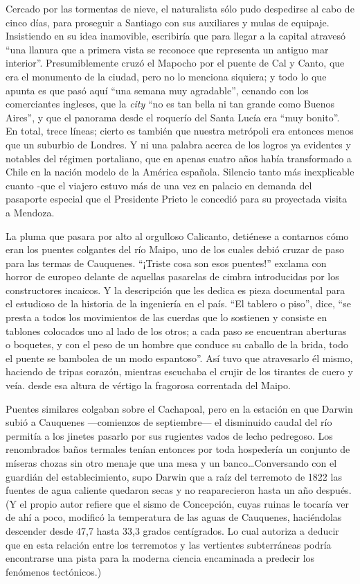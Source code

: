 \documentclass[10pt,twoside,openright]{memoir}
\begin{document}
Cercado
por las tormentas de nieve, el naturalista sólo pudo despedirse al cabo
de cinco días, para proseguir a Santiago con sus auxiliares y mulas de
equipaje. Insistiendo en su idea inamovible, escribiría que para llegar
a la capital atravesó ``una llanura que a primera vista se reconoce que
representa un antiguo mar interior''. Presumiblemente cruzó el Mapocho
por el puente de Cal y Canto, que era el monumento de la ciudad, pero no
lo menciona siquiera; y todo lo que apunta es que pasó aquí ``una semana
muy agradable'', cenando con los comerciantes ingleses, que la
\emph{city} ``no es tan bella ni tan grande como Buenos Aires'', y que el
panorama desde el roquerío del Santa Lucía era ``muy bonito''. En total,
trece líneas; cierto es también que nuestra metrópoli era entonces menos
que un suburbio de Londres. Y ni una palabra acerca de los logros ya
evidentes y notables del régimen portaliano, que en apenas cuatro
años había transformado a Chile en
la nación modelo de la América española. Silencio tanto más inexplicable
cuanto -que el viajero estuvo más de una vez en palacio en demanda del
pasaporte especial que el Presidente Prieto le concedió para su
proyectada visita a Mendoza.

La pluma que pasara por alto al orgulloso Calicanto, detiénese a
contarnos cómo eran los puentes colgantes del río Maipo, uno de los
cuales debió cruzar de paso para las termas de Cauquenes. ``¡Triste
cosa son esos puentes!'' exclama con
horror de europeo delante de
aquellas pasarelas de cimbra introducidas por los constructores
incaicos. Y la descripción que les dedica es pieza documental para
el estudioso de la historia de la
ingeniería en el país. ``El tablero o piso'', dice, ``se presta a todos los
movimientos de las cuerdas que lo sostienen y consiste en tablones
colocados uno al lado de los otros; a cada paso se encuentran aberturas
o boquetes, y con el peso de un hombre que conduce su caballo de la
brida, todo el puente se bambolea de un modo espantoso''. Así tuvo que
atravesarlo él mismo, haciendo de tripas corazón, mientras escuchaba el
crujir de los tirantes de cuero y veía. desde esa altura de vértigo la
fragorosa correntada del Maipo.

Puentes similares colgaban sobre el Cachapoal,
pero en la estación en que Darwin
subió a Cauquenes ---comienzos de septiembre--- el disminuido caudal del
río permitía a los jinetes pasarlo por sus rugientes vados de lecho
pedregoso. Los renombrados baños termales tenían entonces por toda
hospedería un conjunto de míseras chozas sin otro menaje que una mesa y
un banco\ldots Conversando con el guardián del establecimiento, supo Darwin
que a raíz del terremoto de 1822 las fuentes de agua caliente quedaron
secas y no reaparecieron hasta un año después. (Y el propio autor
refiere que el sismo de Concepción, cuyas ruinas le tocaría ver de ahí a
poco, modificó la temperatura de las aguas de Cauquenes, haciéndolas
descender desde 47,7 hasta 33,3 grados centígrados. Lo cual autoriza a
deducir que en esta relación entre los terremotos y las vertientes
subterráneas podría encontrarse una pista para la moderna ciencia
encaminada a predecir los fenómenos tectónicos.)
\end{document}
